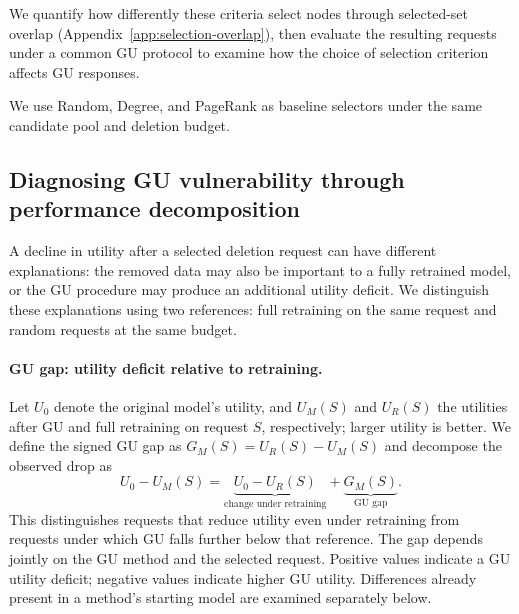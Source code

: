 We quantify how differently these criteria select nodes through selected-set overlap (Appendix~\ref{app:selection-overlap}), then evaluate the resulting requests under a common GU protocol to examine how the choice of selection criterion affects GU responses.

We use Random, Degree, and PageRank as baseline selectors under the same candidate pool and deletion budget.

\subsection{Diagnosing GU vulnerability through performance decomposition}
\label{sec:decomposition}
A decline in utility after a selected deletion request can have different explanations: the removed data may also be important to a fully retrained model, or the GU procedure may produce an additional utility deficit. We distinguish these explanations using two references: full retraining on the same request and random requests at the same budget.

\paragraph{GU gap: utility deficit relative to retraining.}
Let $U_0$ denote the original model's utility, and $U_M(S)$ and $U_R(S)$ the utilities after GU and full retraining on request $S$, respectively; larger utility is better. We define the signed GU gap as $G_M(S)=U_R(S)-U_M(S)$ and decompose the observed drop as
\begin{equation}
U_0-U_M(S)
=\underbrace{U_0-U_R(S)}_{\text{change under retraining}}
+\underbrace{G_M(S)}_{\text{GU gap}}.
\label{eq:retrain-decomposition}
\end{equation}
This distinguishes requests that reduce utility even under retraining from requests under which GU falls further below that reference. The gap depends jointly on the GU method and the selected request. Positive values indicate a GU utility deficit; negative values indicate higher GU utility. Differences already present in a method's starting model are examined separately below.

